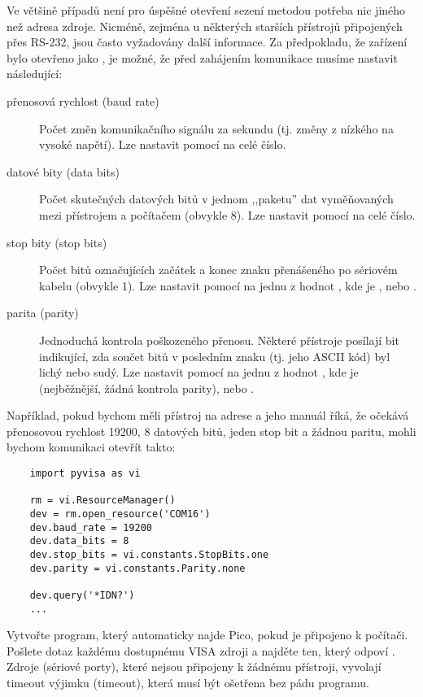 Ve většině případů není pro úspěšné otevření sezení metodou  potřeba nic jiného než adresa zdroje. Nicméně, zejména u některých starších přístrojů připojených přes RS-232, jsou často vyžadovány další informace. Za předpokladu, že zařízení bylo otevřeno jako , je možné, že před zahájením komunikace musíme nastavit následující:
\begin{description}
    \item[přenosová rychlost (baud rate)] Počet změn komunikačního signálu za sekundu (tj. změny z nízkého na vysoké napětí). Lze nastavit pomocí  na celé číslo.
    \item[datové bity (data bits)] Počet skutečných datových bitů v jednom ,,paketu'' dat vyměňovaných mezi přístrojem a počítačem (obvykle 8). Lze nastavit pomocí  na celé číslo.
    \item[stop bity (stop bits)] Počet bitů označujících začátek a konec znaku přenášeného po sériovém kabelu (obvykle 1). Lze nastavit pomocí  na jednu z hodnot , kde  je ,  nebo .
    \item[parita (parity)] Jednoduchá kontrola poškozeného přenosu. Některé přístroje posílají bit indikující, zda součet bitů v posledním znaku (tj. jeho ASCII kód) byl lichý nebo sudý. Lze nastavit pomocí  na jednu z hodnot , kde  je  (nejběžnější, žádná kontrola parity),  nebo .
\end{description}
Například, pokud bychom měli přístroj na adrese  a jeho manuál říká, že očekává přenosovou rychlost 19200, 8 datových bitů, jeden stop bit a žádnou paritu, mohli bychom komunikaci otevřít takto:
\begin{lstlisting}
    import pyvisa as vi

    rm = vi.ResourceManager()
    dev = rm.open_resource('COM16')
    dev.baud_rate = 19200
    dev.data_bits = 8
    dev.stop_bits = vi.constants.StopBits.one
    dev.parity = vi.constants.Parity.none

    dev.query('*IDN?')
    ...
\end{lstlisting}

\begin{exercise}
    Vytvořte program, který automaticky najde Pico, pokud je připojeno k počítači. Pošlete dotaz  každému dostupnému VISA zdroji a najděte ten, který odpoví . Zdroje (sériové porty), které nejsou připojeny k žádnému přístroji, vyvolají timeout výjimku (timeout), která musí být ošetřena bez pádu programu.
\end{exercise}

